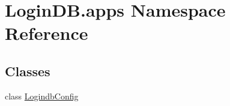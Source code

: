 \hypertarget{namespace_login_d_b_1_1apps}{}\section{Login\+D\+B.\+apps Namespace Reference}
\label{namespace_login_d_b_1_1apps}
\subsection*{Classes}
\begin{DoxyCompactItemize}
\item 
class \hyperlink{class_login_d_b_1_1apps_1_1_logindb_config}{Logindb\+Config}
\end{DoxyCompactItemize}
